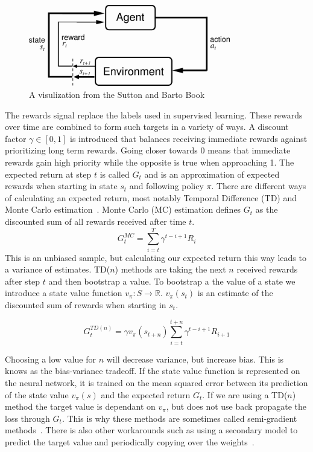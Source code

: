 \documentclass{article}
\begin{document}
\begin{figure}[htbp]
  \centering
  \includegraphics[width = 250pt]{agent_env.png}
  \caption{A visulization from the Sutton and Barto Book~\cite{Sutton1998}}
\end{figure}

\noindent The rewards signal replace the labels used in supervised learning. These rewards over time are
combined to form such targets in a variety of ways. A discount factor $\gamma \in [0,1]$ is introduced that
balances receiving immediate rewards against prioritizing long term rewards. Going closer towards 0 means
that immediate rewards gain high priority while the opposite is true when approaching 1.
The expected return at step $t$ is called $G_t$ and is an approximation of expected rewards when
starting in state $s_t$ and following policy $\pi$.
There are different ways of calculating an expected return, most notably Temporal Difference (TD) and Monte Carlo estimation~\cite{Sutton1998}.
Monte Carlo (MC) estimation defines $G_t$ as the discounted sum of all rewards received after time $t$.
\begin{equation}
    G_t^{MC} = \sum_{i=t}^T \gamma^{t-i+1} R_{i}
\end{equation}
This is an unbiased sample, but calculating our expected return this way leads to a variance of estimates.
TD($n$) methods are taking the next $n$ received rewards after step $t$ and then bootstrap a value. To bootstrap
a the value of a state we introduce a state value function $v_\pi : S \xrightarrow{} \mathbb{R}$. $v_\pi(s_t)$ is an estimate
of the discounted sum of rewards when starting in $s_t$.

\begin{equation}
    G_t^{TD(n)} = \gamma v_\pi(s_{t+n}) \sum_{i=t}^{t+n} \gamma^{t-i+1} R_{i+1}  
\end{equation}

\noindent Choosing a low value for $n$ will decrease variance, but increase bias. This is knows as the bias-variance tradeoff.
If the state value function is represented on the neural network, it is trained on the mean squared error between
its prediction of the state value $v_\pi(s)$ and the expected return $G_t$. If we are using a TD($n$) method the target
value is dependant on $v_\pi$, but does not use back propagate the loss through $G_t$. This is why these methods are sometimes
called semi-gradient methods~\cite{Sutton1998}. There is also other workarounds such as using a secondary model to predict
the target value and periodically copying over the weights~\cite{hessel2017rainbow}.\\
\end{document}
